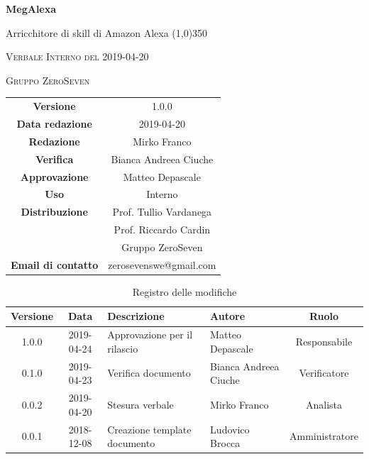 \documentclass[a4paper,12pt]{article}
\author{Mirko Franco}
\date{2019-04-20}
\begin{document}
	\begin{titlepage}
		\centering
		{\huge\bfseries MegAlexa\par}
		Arricchitore di skill di Amazon Alexa
		\line(1,0){350} \\
		{\scshape\LARGE Verbale Interno del 2019-04-20 \par}
		\vspace{1cm}
		{\scshape Gruppo ZeroSeven \par}
		\logo
		\begin{tabular}{c|c}
			{\hfill \textbf{Versione}} 			& 1.0.0				\\
			{\hfill\textbf{Data redazione}} 	& 2019-04-20		\\ 
			{\hfill\textbf{Redazione}} 			&  	Mirko Franco	\\ 
			{\hfill\textbf{Verifica}} 				&  	  	Bianca Andreea Ciuche\\ 
			{\hfill\textbf{Approvazione}} 		&  	Matteo Depascale \\ 
			{\hfill\textbf{Uso}} 					& 	Interno	\\ 
			{\hfill\textbf{Distribuzione}} 			& 			Prof. Tullio Vardanega \\ & Prof. Riccardo Cardin \\ & Gruppo ZeroSeven \\ 
			{\hfill\textbf{Email di contatto}} & zerosevenswe@gmail.com \\
		\end{tabular}
	\end{titlepage}
	
	
	
	\label{LastFrontPage}
	
	
	\newpage
	\cleardoublepage
	\begin{table}[tbph]
		\centering
		\begin{tabularx}{\textwidth}{|c|c|X|X|c|}
			\hline
			\textbf{Versione} & \textbf{Data} & \textbf{Descrizione} & \textbf{Autore} & \textbf{Ruolo} \\
			\hline
			1.0.0 & 2019-04-24 & Approvazione per il rilascio &Matteo Depascale & Responsabile \\
			\hline
			0.1.0 & 2019-04-23 & Verifica documento & Bianca Andreea Ciuche & Verificatore \\
			\hline
			0.0.2 & 2019-04-20 & Stesura verbale &Mirko Franco & Analista \\
			\hline
			0.0.1 & 2018-12-08 & Creazione template documento & Ludovico Brocca & Amministratore\\
			\hline
		\end{tabularx}
		\caption{Registro delle modifiche}
	\end{table}
	\cleardoublepage
	\pagestyle{mymain}
	
\end{document}
